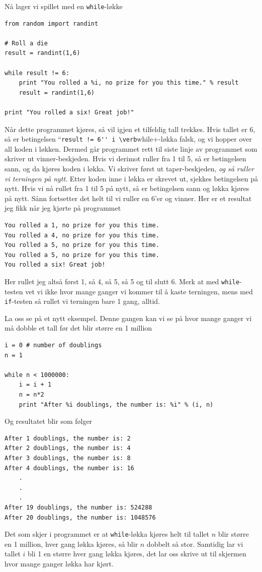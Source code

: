 \documentclass[a4paper, 11pt, notitlepage]{article}
\begin{document}
\clearpage 
Nå lager vi spillet med en \verb+while+-løkke
\begin{lstlisting}
from random import randint

# Roll a die
result = randint(1,6)

while result != 6:
	print "You rolled a %i, no prize for you this time." % result
	result = randint(1,6)

print "You rolled a six! Great job!"
\end{lstlisting}
Når dette programmet kjøres, så vil igjen et tilfeldig tall trekkes. Hvis tallet er 6, så er betingelsen ``\verb+result != 6'' i \verb+while+-løkka falsk, og vi hopper over all koden i løkken. Dermed går programmet rett til siste linje av programmet som skriver ut vinner-beskjeden. Hvis vi derimot ruller fra 1 til 5, så er betingelsen sann, og da kjøres koden i løkka. Vi skriver først ut taper-beskjeden, \emph{og så ruller vi terningen på nytt}. Etter koden inne i løkka er skrevet ut, sjekkes betingelsen på nytt. Hvis vi nå rullet fra 1 til 5 på nytt, så er betingelsen sann og løkka kjøres på nytt. Sånn fortsetter det helt til vi ruller en 6'er og vinner. Her er et resultat jeg fikk når jeg kjørte på programmet
\begin{verbatim}
You rolled a 1, no prize for you this time.
You rolled a 4, no prize for you this time.
You rolled a 5, no prize for you this time.
You rolled a 5, no prize for you this time.
You rolled a six! Great job!
\end{verbatim}
Her rullet jeg altså først 1, så 4, så 5, så 5 og til slutt 6. Merk at med \verb+while+-testen vet vi ikke hvor mange ganger vi kommer til å kaste terningen, mens med \verb+if+-testen så rullet vi terningen bare 1 gang, alltid. 

La oss se på et nytt eksempel. Denne gangen kan vi se på hvor mange ganger vi må dobble et tall før det blir større en 1 million
\begin{lstlisting}
i = 0 # number of doublings
n = 1 

while n < 1000000:
	i = i + 1
	n = n*2
	print "After %i doublings, the number is: %i" % (i, n)
\end{lstlisting}
Og resultatet blir som følger
\begin{verbatim}
After 1 doublings, the number is: 2
After 2 doublings, the number is: 4
After 3 doublings, the number is: 8
After 4 doublings, the number is: 16
	.
	.
	.
After 19 doublings, the number is: 524288
After 20 doublings, the number is: 1048576
\end{verbatim}
Det som skjer i programmet er at \verb+while+-løkka kjøres helt til tallet $n$ blir større en 1 million, hver gang løkka kjøres, så blir $n$ dobbelt så stor. Samtidig lar vi tallet $i$ bli 1 en større hver gang løkka kjøres, det lar oss skrive ut til skjermen hvor mange ganger løkka har kjørt.
\end{document}

